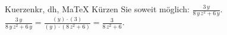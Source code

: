 \begin{MAufgabe}{Kuerzen}{kr, dh, MaTeX}
K\"urzen Sie soweit m\"oglich: $\frac{3\, y}{8\, y\, z^2 + 6\, y}$.\\ 
\ifLsg\MLoesung
\quad $\frac{3\, y}{8\, y\, z^2 + 6\, y}=\frac{(y)\cdot(3)}{(y)\cdot(8\, z^2 + 6)}=\frac{3}{8\, z^2 + 6}$.\else\relax\fi
 \end{MAufgabe}